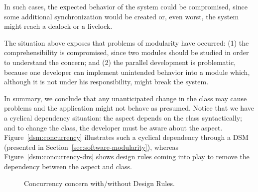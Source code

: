 In such cases, the expected behavior of the system could be
compromised, since some additional synchronization would be created
or, even worst, the system might reach a dealock or a livelock.

The situation above exposes that problems of modularity have
occurred: (1) the comprehensibility is compromised, since two
modules should be studied in order to understand the concern; and
(2) the parallel development is problematic, because one developer
can implement unintended behavior into a module which, although it
is not under his responsibility, might break the system.

In summary, we conclude that any unanticipated change in the class
may cause problems and the application might not behave as presumed.
Notice that we have a cyclical dependency situation: the aspect
depends on the class syntactically; and to change the class, the
developer must be aware about the aspect.
Figure~\ref{dsm:concurrency} illustrates such a cyclical
dependency through a DSM (presented in Section~\ref{sec:software-modularity}), whereas
Figure~\ref{dsm:concurrency-drs} shows design rules coming into
play to remove the dependency between the aspect and class.

\begin{figure}[h]
    \begin{center}
        \caption{Concurrency concern with/without Design Rules.}
    \end{center}
\end{figure}

